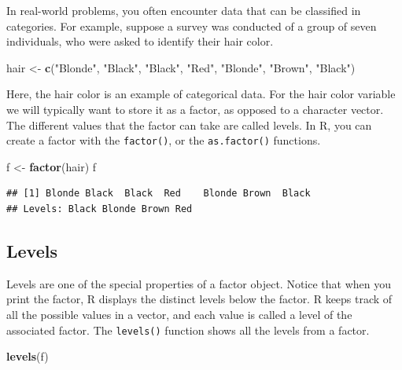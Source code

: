 \documentclass[
]{book}
\newenvironment{Shaded}{\begin{snugshade}}{\end{snugshade}}
\newcommand{\KeywordTok}[1]{\textcolor[rgb]{0.13,0.29,0.53}{\textbf{#1}}}
\newcommand{\NormalTok}[1]{#1}
\newcommand{\StringTok}[1]{\textcolor[rgb]{0.31,0.60,0.02}{#1}}
\begin{document}
In real-world problems, you often encounter data that can be classified in categories. For example, suppose a survey was conducted of a group of seven individuals, who were asked to identify their hair color.

\begin{Shaded}
\begin{Highlighting}[]
\NormalTok{hair <-}\StringTok{ }\KeywordTok{c}\NormalTok{(}\StringTok{"Blonde"}\NormalTok{, }\StringTok{"Black"}\NormalTok{,}
    \StringTok{"Black"}\NormalTok{, }\StringTok{"Red"}\NormalTok{, }\StringTok{"Blonde"}\NormalTok{,}
    \StringTok{"Brown"}\NormalTok{, }\StringTok{"Black"}\NormalTok{)}
\end{Highlighting}
\end{Shaded}

Here, the hair color is an example of categorical data. For the hair color variable we will typically want to store it as a factor, as opposed to a character vector. The different values that the factor can take are called levels. In R, you can create a factor with the \texttt{factor()}, or the \texttt{as.factor()} functions.

\begin{Shaded}
\begin{Highlighting}[]
\NormalTok{f <-}\StringTok{ }\KeywordTok{factor}\NormalTok{(hair)}
\NormalTok{f}
\end{Highlighting}
\end{Shaded}

\begin{verbatim}
## [1] Blonde Black  Black  Red    Blonde Brown  Black 
## Levels: Black Blonde Brown Red
\end{verbatim}

\hypertarget{levels}{%
\subsection{Levels}\label{levels}}

Levels are one of the special properties of a factor object. Notice that when you print the factor, R displays the distinct levels below the factor. R keeps track of all the possible values in a vector, and each value is called a level of the associated factor. The \texttt{levels()} function shows all the levels from a factor.

\begin{Shaded}
\begin{Highlighting}[]
\KeywordTok{levels}\NormalTok{(f)}
\end{Highlighting}
\end{Shaded}
\end{document}
